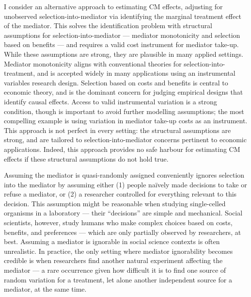 I consider an alternative approach to estimating CM effects, adjusting for unobserved selection-into-mediator via identifying the marginal treatment effect of the mediator.
This solves the identification problem with structural assumptions for selection-into-mediator --- mediator monotonicity and selection based on benefits --- and requires a valid cost instrument for mediator take-up.
While these assumptions are strong, they are plausible in many applied settings.
Mediator monotonicity aligns with conventional theories for selection-into-treatment, and is accepted widely in many applications using an instrumental variables research design.
Selection based on costs and benefits is central to economic theory, and is the dominant concern for judging empirical designs that identify causal effects.
Access to valid instrumental variation is a strong condition, though is important to avoid further modelling assumptions; the most compelling example is using variation in mediator take-up costs as an instrument.
This approach is not perfect in every setting: the structural assumptions are strong, and are tailored to selection-into-mediator concerns pertinent to economic applications.
Indeed, this approach provides no safe harbour for estimating CM effects if these structural assumptions do not hold true.


Assuming the mediator is quasi-randomly assigned conveniently ignores selection into the mediator by assuming either (1) people na\"ively made decisions to take or refuse a mediator, or (2) a researcher controlled for everything relevant to this decision.
This assumption might be reasonable when studying single-celled organisms in a laboratory --- their ``decisions'' are simple and mechanical.
Social scientists, however, study humans who make complex choices based on costs, benefits, and preferences --- which are only partially observed by researchers, at best.
Assuming a mediator is ignorable in social science contexts is often unrealistic.
In practice, the only setting where mediator ignorability becomes credible is when researchers find another natural experiment affecting the mediator --- a rare occurrence given how difficult it is to find one source of random variation for a treatment, let alone another independent source for a mediator, at the same time.

